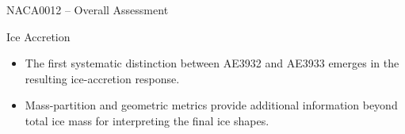 \begin{frame}[shrink]{\small NACA0012 -- Overall Assessment}
\vspace{0.15cm}

\begin{block}{\scriptsize Ice Accretion}
\begin{itemize}
    \item The first systematic distinction between AE3932 and AE3933 emerges in the resulting ice-accretion response.
    \item Mass-partition and geometric metrics provide additional information beyond total ice mass for interpreting the final ice shapes.
\end{itemize}
\end{block}

\end{frame}
